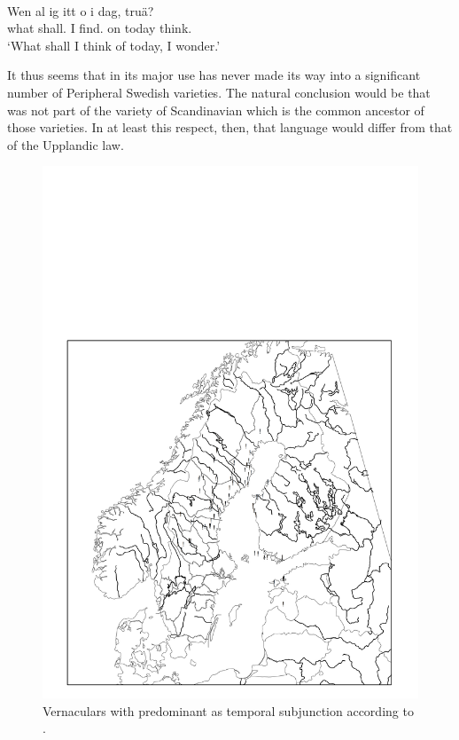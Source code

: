 \ea\label{}
\\
\gll Wen  al  ig  itt  o  {i dag},  truä?\\
what  shall.{\prs}  I  find.{\inf}  on  today  think.{\inf}\\
\glt ‘What shall I think of today, I wonder.’
\z

It thus seems that  in its major use has never made its way into a significant number of Peripheral Swedish varieties. The natural conclusion would be that  was not part of the variety of Scandinavian which is the common ancestor of those varieties. In at least this respect, then, that language would differ from that of the Upplandic law. 

\begin{figure}[h]
\includegraphics[height=.5\textheight]{figures/34_CoreAreasVallmark}
\caption{Vernaculars with predominant as temporal subjunction according to \citet{Vallmark1937}.  }
\label{map:30}
\end{figure}


